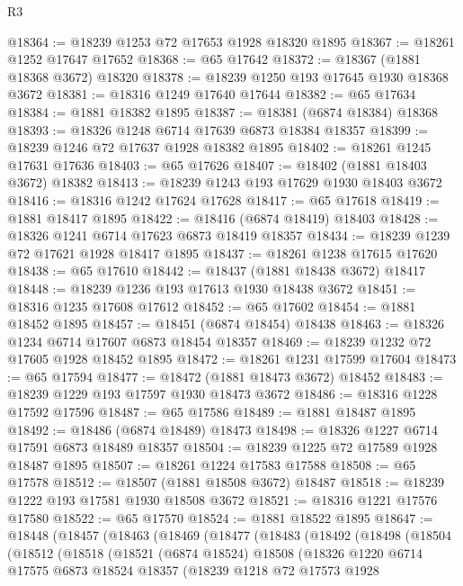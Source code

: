 \begin{lexlean}{R3}
\begin{coremodule}
@18364 := @18239 @1253 @72 @17653 @1928 @18320 @1895
@18367 := @18261 @1252 @17647 @17652
@18368 := @65 @17642
@18372 := @18367 (@1881 @18368 @3672) @18320
@18378 := @18239 @1250 @193 @17645 @1930 @18368 @3672
@18381 := @18316 @1249 @17640 @17644
@18382 := @65 @17634
@18384 := @1881 @18382 @1895
@18387 := @18381 (@6874 @18384) @18368
@18393 := @18326 @1248 @6714 @17639 @6873 @18384 @18357
@18399 := @18239 @1246 @72 @17637 @1928 @18382 @1895
@18402 := @18261 @1245 @17631 @17636
@18403 := @65 @17626
@18407 := @18402 (@1881 @18403 @3672) @18382
@18413 := @18239 @1243 @193 @17629 @1930 @18403 @3672
@18416 := @18316 @1242 @17624 @17628
@18417 := @65 @17618
@18419 := @1881 @18417 @1895
@18422 := @18416 (@6874 @18419) @18403
@18428 := @18326 @1241 @6714 @17623 @6873 @18419 @18357
@18434 := @18239 @1239 @72 @17621 @1928 @18417 @1895
@18437 := @18261 @1238 @17615 @17620
@18438 := @65 @17610
@18442 := @18437 (@1881 @18438 @3672) @18417
@18448 := @18239 @1236 @193 @17613 @1930 @18438 @3672
@18451 := @18316 @1235 @17608 @17612
@18452 := @65 @17602
@18454 := @1881 @18452 @1895
@18457 := @18451 (@6874 @18454) @18438
@18463 := @18326 @1234 @6714 @17607 @6873 @18454 @18357
@18469 := @18239 @1232 @72 @17605 @1928 @18452 @1895
@18472 := @18261 @1231 @17599 @17604
@18473 := @65 @17594
@18477 := @18472 (@1881 @18473 @3672) @18452
@18483 := @18239 @1229 @193 @17597 @1930 @18473 @3672
@18486 := @18316 @1228 @17592 @17596
@18487 := @65 @17586
@18489 := @1881 @18487 @1895
@18492 := @18486 (@6874 @18489) @18473
@18498 := @18326 @1227 @6714 @17591 @6873 @18489 @18357
@18504 := @18239 @1225 @72 @17589 @1928 @18487 @1895
@18507 := @18261 @1224 @17583 @17588
@18508 := @65 @17578
@18512 := @18507 (@1881 @18508 @3672) @18487
@18518 := @18239 @1222 @193 @17581 @1930 @18508 @3672
@18521 := @18316 @1221 @17576 @17580
@18522 := @65 @17570
@18524 := @1881 @18522 @1895
@18647 := @18448
    (@18457
      (@18463
        (@18469
          (@18477
            (@18483
              (@18492
                (@18498
                  (@18504
                    (@18512
                      (@18518
                        (@18521
                          (@6874 @18524)
                          @18508
                          (@18326
                            @1220
                            @6714
                            @17575
                            @6873
                            @18524
                            @18357
                            (@18239
                              @1218
                              @72
                              @17573
                              @1928

\end{coremodule}
\end{lexlean}
